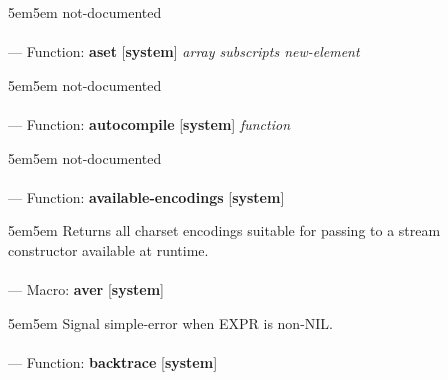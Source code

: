 \begin{adjustwidth}{5em}{5em}
not-documented
\end{adjustwidth}

\paragraph{}
\label{SYSTEM:ASET}
--- Function: \textbf{aset} [\textbf{system}] \textit{array subscripts new-element}

\begin{adjustwidth}{5em}{5em}
not-documented
\end{adjustwidth}

\paragraph{}
\label{SYSTEM:AUTOCOMPILE}
--- Function: \textbf{autocompile} [\textbf{system}] \textit{function}

\begin{adjustwidth}{5em}{5em}
not-documented
\end{adjustwidth}

\paragraph{}
\label{SYSTEM:AVAILABLE-ENCODINGS}
--- Function: \textbf{available-encodings} [\textbf{system}] \textit{}

\begin{adjustwidth}{5em}{5em}
Returns all charset encodings suitable for passing to a stream constructor available at runtime.
\end{adjustwidth}

\paragraph{}
\label{SYSTEM:AVER}
--- Macro: \textbf{aver} [\textbf{system}] \textit{}

\begin{adjustwidth}{5em}{5em}
Signal simple-error when EXPR is non-NIL.
\end{adjustwidth}

\paragraph{}
\label{SYSTEM:BACKTRACE}
--- Function: \textbf{backtrace} [\textbf{system}] \textit{}

